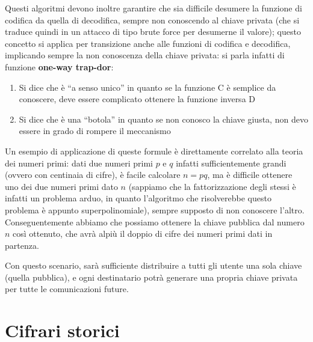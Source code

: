 Questi algoritmi devono inoltre garantire che sia difficile desumere la funzione di codifica
da quella di decodifica, sempre non conoscendo al chiave privata (che si traduce quindi in un attacco di tipo
brute force per desumerne il valore); questo concetto si applica per 
transizione anche alle funzioni di codifica e decodifica, implicando sempre la
non conoscenza della chiave privata: si parla infatti di funzione \textbf{one-way trap-dor}:
\begin{enumerate}
\item Si dice che è ``a senso unico'' in quanto se la funzione C
	è semplice da conoscere, deve essere complicato ottenere la funzione 
	inversa D
\item Si dice che è una ``botola'' in quanto se non conosco la chiave giusta,
	non devo essere in grado di rompere il meccanismo
\end{enumerate}
Un esempio di applicazione di queste formule è direttamente correlato alla
teoria dei numeri primi: dati due numeri primi $p$ e $q$ infatti sufficientemente
grandi (ovvero con centinaia di cifre), è facile calcolare $n=pq$, ma è difficile
ottenere uno dei due numeri primi dato $n$ (sappiamo che la fattorizzazione
degli stessi è infatti un problema arduo, in quanto l'algoritmo che risolverebbe
questo problema è appunto superpolinomiale), sempre supposto di non conoscere
l'altro. Conseguentemente abbiamo che possiamo ottenere la chiave pubblica dal
numero $n$ così ottenuto, che avrà alpiù il doppio di cifre dei numeri primi
dati in partenza.


Con questo scenario, sarà sufficiente distribuire a tutti gli utente una sola 
chiave (quella pubblica), e ogni destinatario potrà generare una propria chiave
privata per tutte le comunicazioni future.

\section{Cifrari storici}
